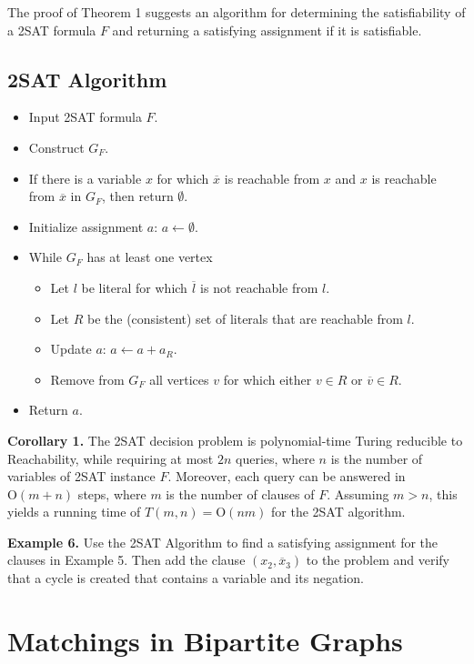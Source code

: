 \documentclass [12pt]{article}
\theoremstyle{definition}
\begin{document}
 The proof of Theorem 1 suggests an algorithm for determining the satisfiability of a 2SAT formula $F$ and returning a satisfying assignment if it is satisfiable. 

\subsection*{2SAT Algorithm}
\begin{itemize}
 \renewcommand{\labelitemi}{}
 \renewcommand{\labelitemii}{}
 \renewcommand{\labelitemiii}{}
\item Input 2SAT formula $F$.
\item Construct $G_{F}$.
\item If there is a variable $x$ for which  
$\overline{x}$ is reachable from $x$ and $x$ is reachable from $\overline{x}$ in $G_{F}$, then return $\emptyset$.
\item Initialize assignment $a$:  $a\leftarrow\emptyset$.
\item While $G_{F}$ has at least one vertex
\begin{itemize}
\item Let $l$ be literal for which $\overline{l}$ is not reachable from $l$. 
\item Let $R$ be the (consistent) set of literals that are reachable from $l$.
\item Update $a$: $a\leftarrow a+a_{R}$.
\item Remove from $G_{F}$ all vertices $v$ for which either $v\in R$ or $\overline{v}\in R$. 
\end{itemize}
\item Return $a$.
\end{itemize}

{\bf Corollary 1.} The 2SAT decision problem is polynomial-time Turing reducible to Reachability, while requiring at most $2n$ queries, where $n$ is the number of variables of 2SAT instance $F$.
Moreover, each query can be answered in $\mbox{O}(m+n)$ steps, where $m$ is the number of clauses of $F$. Assuming $m > n$, this yields a running time of $T(m,n)=\mbox{O}(nm)$ for the 2SAT algorithm. 




\newpage
\noindent
{\bf Example 6.} Use the 2SAT Algorithm to find a satisfying assignment for the clauses in Example 5.
Then add the clause $(x_{2},\overline{x}_{3})$ to the problem and verify that a cycle is created that contains
a variable and its negation.

\newpage
\noindent
\section*{Matchings in Bipartite Graphs}
\end{document}
